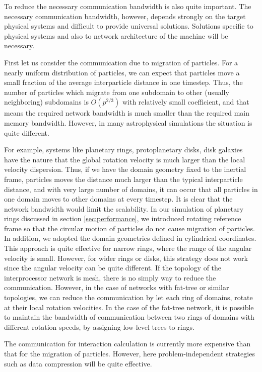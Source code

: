 To reduce the necessary communication bandwidth is also quite
important. The necessary communication bandwidth, however,  depends
strongly on the target physical systems and difficult to provide
universal solutions. Solutions specific to physical systems and also
to network architecture of the machine will be necessary. 

First let us consider the communication due to migration of particles.
For a nearly uniform distribution of particles, we can
expect that particles move a small fraction of the average
interparticle distance in one timestep. Thus, the number of particles
which migrate from one subdomain to other (usually
neighboring) subdomains is $O(p^{2/3})$ with relatively small
coefficient, and that means the required network bandwidth is much
smaller than the required main memory bandwidth. However, in many
astrophysical simulations the situation is quite different. 

For example, systems like planetary rings, protoplanetary disks, disk
galaxies have the nature that the global rotation velocity is much larger
than the local velocity dispersion. Thus, if we have the domain geometry
fixed to the inertial frame, particles moves the distance much larger
than the typical interparticle distance, and with very large number of
domains, it can occur that all particles in one domain moves to other
domains at every timestep. It is clear that the network bandwidth
would limit the scalability. In our simulation of planetary rings
discussed in section \ref{sec:performance}, we introduced rotating
reference frame so that the circular motion of particles do not cause
migration of particles.  In addition, we adopted the domain geometries
defined in cylindrical coordinates.  This approach is quite effective
for narrow rings, where the range of the angular velocity is
small. However, for wider rings or disks, this strategy does not work
since the angular velocity can be quite different. If the topology of
the interprocessor network is mesh, there is no simply way to reduce
the communication. However, in the case of networks with fat-tree or
similar topologies, we can reduce the communication by let each ring of
domains, rotate at their local rotation velocities. In the case of the
fat-tree network, it is possible to maintain the bandwidth of
communication between two rings of domains with different rotation
speeds, by assigning low-level trees to rings.

The communication for interaction calculation is currently more
expensive than that for the migration of particles. However,
here problem-independent strategies such as data compression will be
quite effective. 

